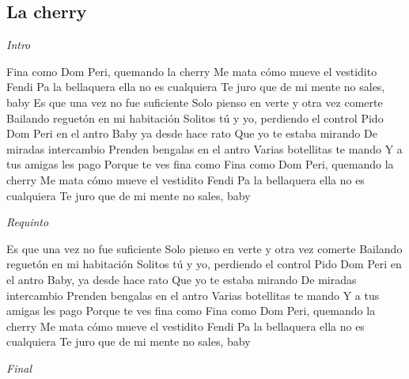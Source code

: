 \subsection{La cherry}
\noindent

\vspace{1cm}

\begin{guitar}
	\begin{multicols}{2}

		\textit{Intro}

	Fina como Dom Peri, quemando la cherry
	Me mata cómo mueve el vestidito Fendi
	Pa la bellaquera ella no es cualquiera
	Te juro que de mi mente no sales, baby
	Es que una vez no fue suficiente
	Solo pienso en verte y otra vez comerte
	Bailando reguetón en mi habitación
	Solitos tú y yo, perdiendo el control
	Pido Dom Peri en el antro
	Baby ya desde hace rato
	Que yo te estaba mirando 
	De miradas intercambio
	Prenden bengalas en el antro
	Varias botellitas te mando
	Y a tus amigas les pago
	Porque te ves fina como
	Fina como Dom Peri, quemando la cherry
	Me mata cómo mueve el vestidito Fendi
	Pa la bellaquera ella no es cualquiera
	Te juro que de mi mente no sales, baby

	\par
	\textit{Requinto}
	\par

	Es que una vez no fue suficiente
	Solo pienso en verte y otra vez comerte
	Bailando reguetón en mi habitación
	Solitos tú y yo, perdiendo el control
	Pido Dom Peri en el antro
	Baby, ya desde hace rato
	Que yo te estaba mirando
	De miradas intercambio
	Prenden bengalas en el antro
	Varias botellitas te mando
	Y a tus amigas les pago
	Porque te ves fina como
	Fina como Dom Peri, quemando la cherry
	Me mata cómo mueve el vestidito Fendi
	Pa la bellaquera ella no es cualquiera
	Te juro que de mi mente no sales, baby

		\textit{Final}

	\end{multicols}
\end{guitar}
